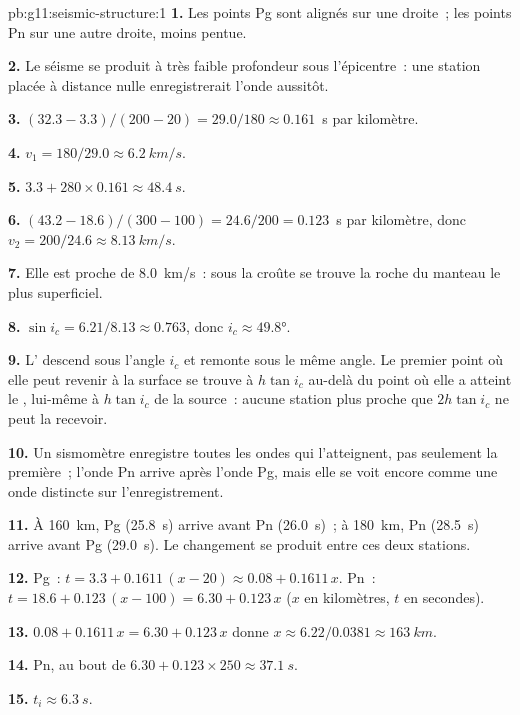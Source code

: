 \begin{solution}{pb:g11:seismic-structure:1}
\textbf{1.} Les points Pg sont alignés sur une droite~; les points Pn sur une
autre droite, moins pentue.

\textbf{2.} Le séisme se produit à très faible profondeur sous l'épicentre~:
une station placée à distance nulle enregistrerait l'onde aussitôt.

\textbf{3.} $(32.3 - 3.3)/(200 - 20) = 29.0/180 \approx \num{0.161}$~\unit{s}
par kilomètre.

\textbf{4.} $v_1 = 180/29.0 \approx \qty{6.2}{km/s}$.

\textbf{5.} $3.3 + 280 \times 0.161 \approx \qty{48.4}{s}$.

\textbf{6.} $(43.2 - 18.6)/(300 - 100) = 24.6/200 = \num{0.123}$~\unit{s}
par kilomètre, donc $v_2 = 200/24.6 \approx \qty{8.13}{km/s}$.

\textbf{7.} Elle est proche de \qty{8.0}{km/s}~: sous la croûte se trouve la
roche du manteau le plus superficiel.

\textbf{8.} $\sin i_c = 6.21/8.13 \approx 0.763$, donc $i_c \approx
\ang{49.8}$.

\textbf{9.} L' descend sous l'angle $i_c$ et remonte sous le
même angle. Le premier point où elle peut revenir à la surface se trouve à
$h\tan i_c$ au-delà du point où elle a atteint le , lui-même à $h\tan i_c$
de la source~: aucune station plus proche que $2h\tan i_c$ ne peut la
recevoir.

\textbf{10.} Un sismomètre enregistre toutes les ondes qui l'atteignent, pas
seulement la première~; l'onde Pn arrive après l'onde Pg, mais elle se voit
encore comme une onde distincte sur l'enregistrement.

\textbf{11.} À \qty{160}{km}, Pg (\qty{25.8}{s}) arrive avant Pn
(\qty{26.0}{s})~; à \qty{180}{km}, Pn (\qty{28.5}{s}) arrive avant Pg
(\qty{29.0}{s}). Le changement se produit entre ces deux stations.

\textbf{12.} Pg~: $t = 3.3 + 0.1611\,(x - 20) \approx 0.08 + 0.1611\,x$. Pn~:
$t = 18.6 + 0.123\,(x - 100) = 6.30 + 0.123\,x$ ($x$ en kilomètres, $t$ en
secondes).

\textbf{13.} $0.08 + 0.1611\,x = 6.30 + 0.123\,x$ donne $x \approx
6.22/0.0381 \approx \qty{163}{km}$.

\textbf{14.} Pn, au bout de $6.30 + 0.123 \times 250 \approx \qty{37.1}{s}$.

\textbf{15.} $t_i \approx \qty{6.3}{s}$.


\end{solution}
